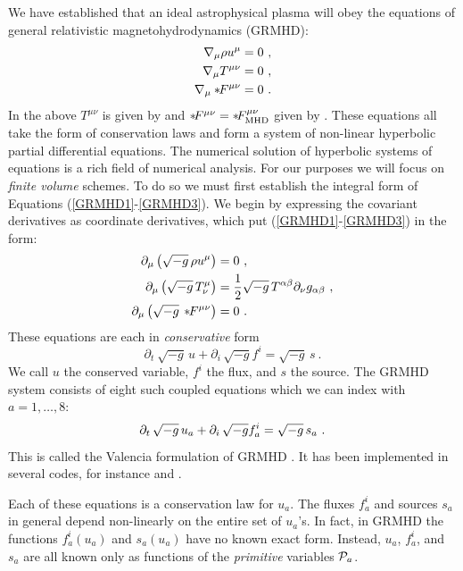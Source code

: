 We have established that an ideal astrophysical plasma will obey the equations of general relativistic magnetohydrodynamics (GRMHD):
\begin{align}
	\nabla_\mu  \rho u^\mu &= 0\ , \eqlabel{GRMHD1}\\
	\nabla_\mu T^{\mu\nu} &= 0\ , \eqlabel{GRMHD2}\\
	\nabla_\mu \dual{F}^{\mu\nu} &= 0\ . \eqlabel{GRMHD3}
\end{align}
In the above $T^{\mu\nu}$ is given by  and $*\! F^{\mu\nu} = *\! F^{\mu\nu}_{\text{MHD}}$ given by .  These equations all take the form of conservation laws and form a system of non-linear hyperbolic partial differential equations.  The numerical solution of hyperbolic systems of equations is a rich field of numerical analysis.  For our purposes we will focus on \emph{finite volume} schemes.  To do so we must first establish the integral form of Equations (\eqref{GRMHD1}-\eqref{GRMHD3}).  We begin by expressing the covariant derivatives as coordinate derivatives, which put (\eqref{GRMHD1}-\eqref{GRMHD3}) in the form:
\begin{align}
	\partial_\mu \left(\sqrt{-g}\ \! \rho u^\mu\right) &= 0\ , \\
	\partial_\mu\left( \sqrt{-g}\ \!T^{\mu}_\nu\right) &= \frac{1}{2}\sqrt{-g}\ \!T^{\alpha\beta}\partial_\nu g_{\alpha \beta}\ , \\
	\partial_\mu \left(\sqrt{-g}\ \! \dual{F}^{\mu\nu}\right) &= 0\ . \eqlabel{GRMHDcoord}
\end{align}
These equations are each in \emph{conservative} form
\begin{equation}
	\partial_t\ \!\sqrt{-g}\, u + \partial_i\, \sqrt{-g}f^i = \sqrt{-g}\,s \ .
\end{equation}
We call $u$ the conserved variable, $f^i$ the flux, and $s$ the source. The GRMHD system consists of eight such coupled equations which we can index with $a=1,\dots,8$:
\begin{equation}
	\partial_t\ \!\sqrt{-g}\, u_a + \partial_i\, \sqrt{-g}f^i_a = \sqrt{-g}\,s_a \ . \eqlabel{hyperbolicsystem}
\end{equation}
This is called the Valencia formulation of GRMHD \citep{Marti91, Banyuls97, Font08}.  It has been implemented in several codes, for instance \citealt{HARM} and \citealt{Duez05}.

Each of these equations is a conservation law for $u_a$.  The fluxes $f^i_a$ and sources $s_a$ in general depend non-linearly on the entire set of $u_a$'s.  In fact, in GRMHD the functions $f^i_a(u_a)$ and $s_a(u_a)$ have no known exact form.  Instead, $u_a$, $f^i_a$, and $s_a$ are all known only as functions of the \emph{primitive} variables $\mathcal{P}_a$. 


